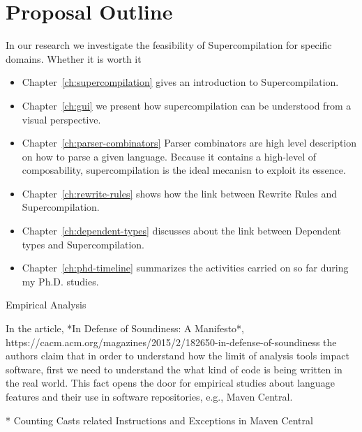 


\section{Proposal Outline}

In our research we investigate the feasibility of Supercompilation for specific domains.
Whether it is worth it

\begin{itemize}

\item Chapter~\ref{ch:supercompilation} gives an introduction to Supercompilation.

\item Chapter~\ref{ch:gui} we present how supercompilation can be understood from a visual perspective.

\item Chapter~\ref{ch:parser-combinators} Parser combinators are high level description on how to parse a given language.
Because it contains a high-level of composability, supercompilation is the ideal mecanisn to exploit its essence.

\item Chapter~\ref{ch:rewrite-rules} shows how the link between Rewrite Rules and Supercompilation.

\item Chapter~\ref{ch:dependent-types} discusses about the link between Dependent types and Supercompilation.

\item Chapter~\ref{ch:phd-timeline} summarizes the activities carried on so far during my Ph.D. studies.

\end{itemize}



Empirical Analysis


In the article, *In Defense of Soundiness: A Manifesto*,
https://cacm.acm.org/magazines/2015/2/182650-in-defense-of-soundiness
the authors claim that in order to understand how the limit of analysis tools impact software,
first we need to understand the what kind of code is being written in the real world.
This fact opens the door for empirical studies about language features and their use in
software repositories, e.g., Maven Central.


* Counting Casts related Instructions and Exceptions in Maven Central

